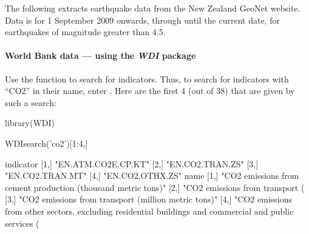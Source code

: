   The following
extracts earthquake data from the New Zealand GeoNet
website.  Data is for 1 September 2009 onwards, through until the
current date, for earthquakes of magnitude greater than 4.5.
\begin{Schunk}
\end{Schunk}

\paragraph{World Bank data --- using the {\em WDI} package}

Use the function  to search for indicators.  Thus,
to search for indicators with ``CO2'' in their name, enter
.  Here are the first 4 (out of 38) that are
given by such a search:
\begin{fullwidth}
\begin{Schunk}
\begin{Sinput}
library(WDI)
\end{Sinput}
\begin{Sinput}
WDIsearch('co2')[1:4,]
\end{Sinput}
\begin{Soutput}
     indicator          
[1,] "EN.ATM.CO2E.CP.KT"
[2,] "EN.CO2.TRAN.ZS"   
[3,] "EN.CO2.TRAN.MT"   
[4,] "EN.CO2.OTHX.ZS"   
     name                                                                                                                               
[1,] "CO2 emissions from cement production (thousand metric tons)"                                                                      
[2,] "CO2 emissions from transport (% of total fuel combustion)"                                                                        
[3,] "CO2 emissions from transport (million metric tons)"                                                                               
[4,] "CO2 emissions from other sectors, excluding residential buildings and commercial and public services (% of total fuel combustion)"
\end{Soutput}
\end{Schunk}
\end{fullwidth}

